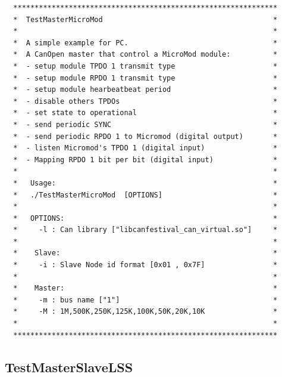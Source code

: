 \documentclass[12pt,english,a4paper]{book}
\begin{document}
\begin{verbatim}
  **************************************************************
  *  TestMasterMicroMod                                        *
  *                                                            *
  *  A simple example for PC.                                  *
  *  A CanOpen master that control a MicroMod module:          *
  *  - setup module TPDO 1 transmit type                       *
  *  - setup module RPDO 1 transmit type                       *
  *  - setup module hearbeatbeat period                        *
  *  - disable others TPDOs                                    *
  *  - set state to operational                                *
  *  - send periodic SYNC                                      *
  *  - send periodic RPDO 1 to Micromod (digital output)       *
  *  - listen Micromod's TPDO 1 (digital input)                *
  *  - Mapping RPDO 1 bit per bit (digital input)              *
  *                                                            *
  *   Usage:                                                   *
  *   ./TestMasterMicroMod  [OPTIONS]                          *
  *                                                            *
  *   OPTIONS:                                                 *
  *     -l : Can library ["libcanfestival_can_virtual.so"]     *
  *                                                            *
  *    Slave:                                                  *
  *     -i : Slave Node id format [0x01 , 0x7F]                *
  *                                                            *
  *    Master:                                                 *
  *     -m : bus name ["1"]                                    *
  *     -M : 1M,500K,250K,125K,100K,50K,20K,10K                *
  *                                                            *
  **************************************************************
\end{verbatim}

\subsection{TestMasterSlaveLSS}
\end{document}
